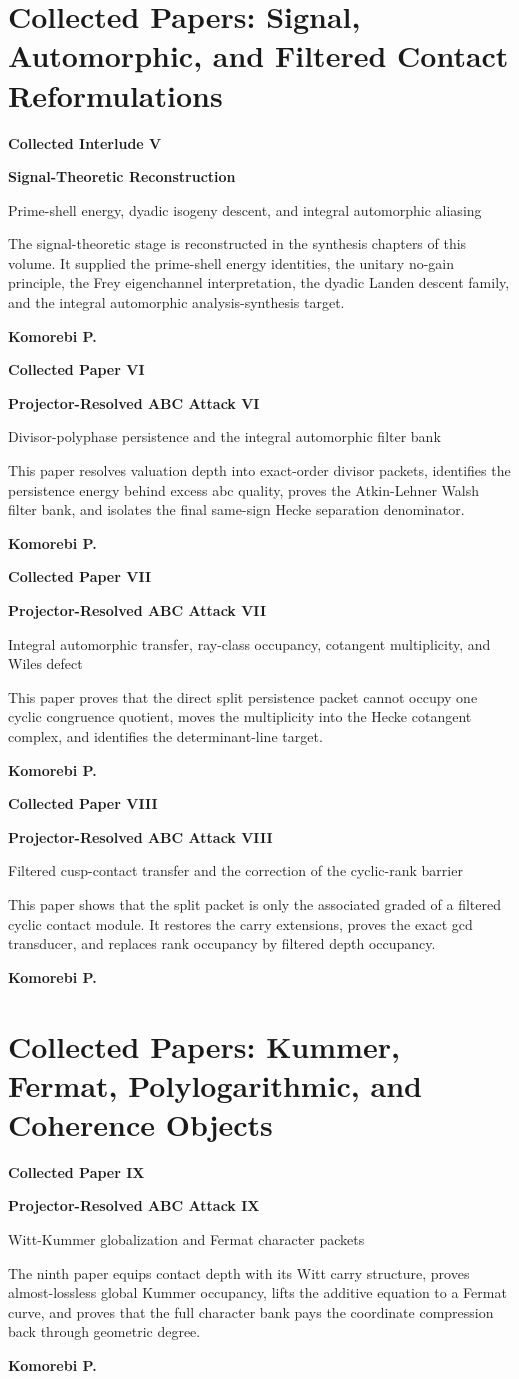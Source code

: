 \documentclass[11pt,openany]{book}
\theoremstyle{definition}
\theoremstyle{remark}
\newcommand{\PaperDivider}[4]{%
\clearpage
\thispagestyle{empty}
\vspace*{0.85in}
{\color{Blue}\Large\bfseries #1\par}
\vspace{0.16in}
{\Huge\bfseries #2\par}
\vspace{0.16in}
{\Large\color{Muted} #3\par}
\vspace{0.40in}
\begin{minipage}{0.88\textwidth}
\large #4
\end{minipage}
\vfill
{\large\bfseries Komorebi P.\par}
\clearpage}
\begin{document}
\part{Collected Papers: Signal, Automorphic, and Filtered Contact Reformulations}
\PaperDivider{Collected Interlude V}{Signal-Theoretic Reconstruction}{Prime-shell energy, dyadic isogeny descent, and integral automorphic aliasing}{The signal-theoretic stage is reconstructed in the synthesis chapters of this volume. It supplied the prime-shell energy identities, the unitary no-gain principle, the Frey eigenchannel interpretation, the dyadic Landen descent family, and the integral automorphic analysis-synthesis target.}

\PaperDivider{Collected Paper VI}{Projector-Resolved ABC Attack VI}{Divisor-polyphase persistence and the integral automorphic filter bank}{This paper resolves valuation depth into exact-order divisor packets, identifies the persistence energy behind excess abc quality, proves the Atkin-Lehner Walsh filter bank, and isolates the final same-sign Hecke separation denominator.}


\PaperDivider{Collected Paper VII}{Projector-Resolved ABC Attack VII}{Integral automorphic transfer, ray-class occupancy, cotangent multiplicity, and Wiles defect}{This paper proves that the direct split persistence packet cannot occupy one cyclic congruence quotient, moves the multiplicity into the Hecke cotangent complex, and identifies the determinant-line target.}


\PaperDivider{Collected Paper VIII}{Projector-Resolved ABC Attack VIII}{Filtered cusp-contact transfer and the correction of the cyclic-rank barrier}{This paper shows that the split packet is only the associated graded of a filtered cyclic contact module. It restores the carry extensions, proves the exact gcd transducer, and replaces rank occupancy by filtered depth occupancy.}


\part{Collected Papers: Kummer, Fermat, Polylogarithmic, and Coherence Objects}
\PaperDivider{Collected Paper IX}{Projector-Resolved ABC Attack IX}{Witt-Kummer globalization and Fermat character packets}{The ninth paper equips contact depth with its Witt carry structure, proves almost-lossless global Kummer occupancy, lifts the additive equation to a Fermat curve, and proves that the full character bank pays the coordinate compression back through geometric degree.}

\end{document}
